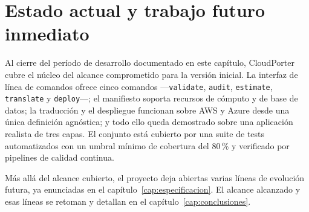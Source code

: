 \section{Estado actual y trabajo futuro inmediato}
\label{sec:estado-actual}

Al cierre del período de desarrollo documentado en este capítulo, CloudPorter cubre el núcleo
del alcance comprometido para la versión inicial. La interfaz de línea de comandos ofrece cinco
comandos —\texttt{validate}, \texttt{audit}, \texttt{estimate}, \texttt{translate} y
\texttt{deploy}—; el manifiesto soporta recursos de cómputo y de base de datos; la traducción y
el despliegue funcionan sobre AWS y Azure desde una única definición agnóstica; y todo ello queda
demostrado sobre una aplicación realista de tres capas. El conjunto está cubierto por una suite
de tests automatizados con un umbral mínimo de cobertura del 80\,\% y verificado por pipelines de
calidad continua.

Más allá del alcance cubierto, el proyecto deja abiertas varias líneas de evolución futura, ya
enunciadas en el capítulo~\ref{cap:especificacion}. El alcance alcanzado y esas líneas se retoman
y detallan en el capítulo~\ref{cap:conclusiones}.
